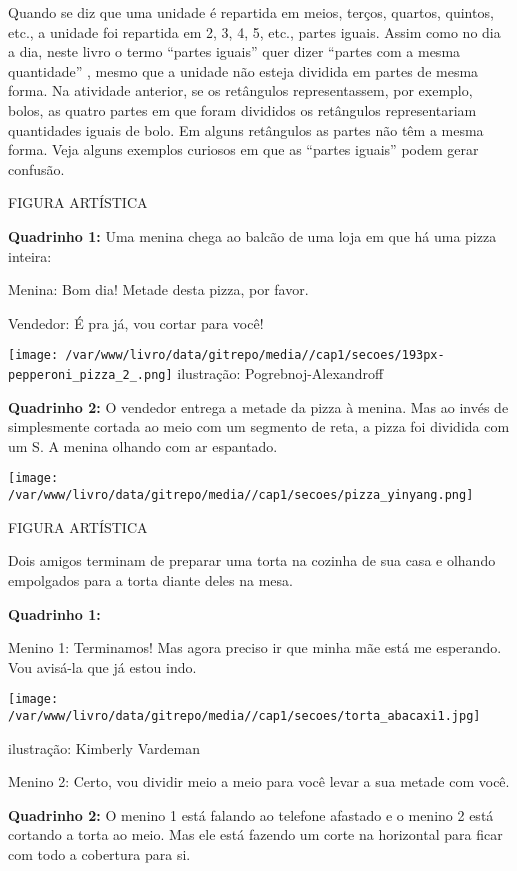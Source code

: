 \documentclass[a4,12pt]{book}
\begin{document}
\begin{refletindo*}[breakable]{}{}  
  Quando se diz que uma unidade é repartida em meios, terços, quartos, quintos, etc., a unidade foi repartida em 2, 3, 4, 5, etc., partes iguais.  
  Assim como no dia a dia, neste livro o termo   ``partes iguais''   quer dizer   ``partes com a mesma quantidade''  , mesmo que a unidade não esteja dividida em partes de mesma forma.  
  Na atividade anterior, se os retângulos representassem, por exemplo, bolos, as quatro partes em que foram divididos os retângulos representariam quantidades iguais de bolo.   
  Em alguns retângulos as partes não têm a mesma forma.  
  Veja alguns exemplos curiosos em que as   ``partes iguais''   podem gerar confusão.  
  
  \begin{imagem*}[breakable]{}{}     FIGURA ARTÍSTICA    
    
    {\bf Quadrinho 1:}     Uma menina chega ao balcão de uma loja em que há uma pizza inteira:     
    
    Menina: Bom dia! Metade desta pizza, por favor.     
    
    Vendedor: É pra já, vou cortar para você!    
    
        \texttt{[image: /var/www/livro/data/gitrepo/media//cap1/secoes/193px-pepperoni\_pizza\_2\_.png]}    
    ilustração: Pogrebnoj-Alexandroff    
    
    {\bf Quadrinho 2:}     O vendedor entrega a metade da pizza à menina. Mas ao invés de simplesmente cortada ao meio com um segmento de reta, a pizza foi dividida com um S. A menina olhando com ar espantado.     
    
        \texttt{[image: /var/www/livro/data/gitrepo/media//cap1/secoes/pizza\_yinyang.png]}    
  \end{imagem*}  
  
  \begin{imagem*}[breakable]{}{}     FIGURA ARTÍSTICA    
    
    Dois amigos terminam de preparar uma torta na cozinha de sua casa e olhando empolgados para a torta diante deles na mesa.    
    
    {\bf Quadrinho 1:}         
    
    Menino 1:  Terminamos! Mas agora preciso ir que minha mãe está me esperando. Vou avisá-la que já estou indo.    
    
        \texttt{[image: /var/www/livro/data/gitrepo/media//cap1/secoes/torta\_abacaxi1.jpg]}    
    
    ilustração: Kimberly Vardeman    
    
    Menino 2: Certo, vou dividir meio a meio para você levar a sua metade com você.    
    
    {\bf Quadrinho 2:}    
    O menino 1 está falando ao telefone afastado e o menino 2 está cortando a torta ao meio. Mas ele está fazendo um corte na horizontal para ficar com todo a cobertura para si.    
  \end{imagem*}  
\end{refletindo*}
\end{document}
